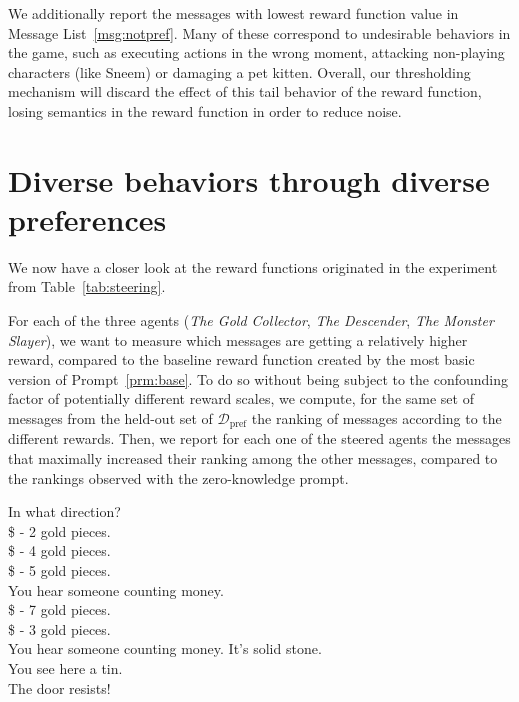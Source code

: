 \documentclass{article} %
\begin{document}
We additionally report the messages with lowest reward function value in Message List~\ref{msg:notpref}.
Many of these correspond to undesirable behaviors in the game, such as executing actions in the wrong moment, attacking non-playing characters (like Sneem) or damaging a pet kitten.
Overall, our thresholding mechanism will discard the effect of this tail behavior of the reward function, losing semantics in the reward function in order to reduce noise.

\section{Diverse behaviors through diverse preferences}
We now have a closer look at the reward functions originated in the experiment from Table~\ref{tab:steering}.

For each of the three agents (\emph{The Gold Collector}, \emph{The Descender}, \emph{The Monster Slayer}), we want to measure which messages are getting a relatively higher reward, compared to the baseline reward function created by the most basic version of Prompt~\ref{prm:base}.
To do so without being subject to the confounding factor of potentially different reward scales, we compute, for the same set of messages from the held-out set of $\mathcal D_\text{pref}$ the ranking of messages according to the different rewards.
Then, we report for each one of the steered agents the messages that maximally increased their ranking among the other messages, compared to the rankings observed with the zero-knowledge prompt.

\begin{messages}
\begin{mymessagebox}[frametitle=Relatively most preferred messages for \textit{The Gold Collector}]
\small{}\selectfont
In what direction? \\
\$ - 2 gold pieces.\\
\$ - 4 gold pieces.\\
\$ - 5 gold pieces.\\
You hear someone counting money.\\
\$ - 7 gold pieces.\\
\$ - 3 gold pieces.\\
You hear someone counting money.  It's solid stone.\\
You see here a tin.\\
The door resists!\\
\end{mymessagebox}
\caption{Messages more emphasized by the prompt used by \emph{The Gold Collector} compared to the baseline prompt.}
\label{msg:gold_collector}
\end{messages}
\end{document}
